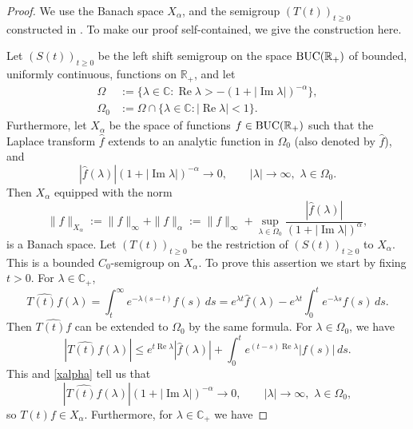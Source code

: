 \documentclass[11pt]{amsart}
\theoremstyle{definition}
\theoremstyle{remark}
\numberwithin{equation}{section}
\begin{document}
\begin{proof}
We use the Banach space $X_{\alpha}$, and the semigroup $(T(t))_{t\ge0}$ constructed in \cite[Theorem 4.1]{BoTo10}. To make our proof self-contained, we give the construction here.

Let $(S(t))_{t \ge 0}$ be the left shift semigroup on the space ${\rm BUC}
(\mathbb R_+ )$ of bound\-ed, uniformly continuous, functions on ${{\mathbb R}}_+$, and let
\begin{align*}
\Omega &:=\{\lambda \in\mathbb C: {\operatorname{Re}}  \lambda
> - (1+|{\operatorname{Im}} \lambda|)^{-\alpha}\}, \\
\Omega_0 &:=\Omega \cap \{\lambda \in \mathbb C: |{\operatorname{Re}} \lambda| < 1 \}.
\end{align*}
Furthermore, let
$X_{\alpha}$ be the space of functions $f\in {\rm BUC}({{\mathbb R}}_+ )$
such that the Laplace transform $\widehat{f}$ extends to an
analytic function in $\Omega_0$ (also denoted by $\widehat f$), and
\begin{equation} \label{xalpha}
|\widehat f(\lambda)|(1+|{\operatorname{Im}} \lambda|)^{-\alpha} \to 0, \qquad
|\lambda| \to \infty, \, \, \lambda \in \Omega_0.
\end{equation}
Then $X_\alpha$ equipped with the norm
\begin{equation*}
\| f \|_{X_{\alpha}}  := \| f \|_{\infty} + \|f \|_\alpha :=
\|f\|_{\infty} + \sup_{\lambda \in \Omega_0} \frac{|\widehat f(\lambda)|}
{(1+|{\operatorname{Im}}\lambda|)^{\alpha}},
\end{equation*}
is a Banach space.  Let $(T(t))_{t \ge 0}$ be the restriction of $(S(t))_{t \ge 0}$ to $X_\alpha$.  This is  a bounded $C_0$-semigroup on $X_\alpha$. To prove this assertion we start by fixing $t>0$.   For $\lambda \in {{\mathbb C}}_+$,
\begin{equation} \label{Tthat}
\widehat {T(t)f} (\lambda) =  \int_t^\infty e^{-\lambda (s-t)} f(s) \, ds = e^{\lambda t}\widehat{f}(\lambda) - e^{\lambda t} \int_{0}^{t} e^{-\lambda s}f(s) \, ds.
\end{equation}
Then $\widehat {T(t)f}$ can be extended to  $\Omega_0$ by the same formula.  For $\lambda\in\Omega_0$, we have
$$
|\widehat {T(t)f} (\lambda)|\le e^{t{\operatorname{Re}}\lambda}|\widehat {f} (\lambda)|
+\int_{0}^{t}e^{(t-s){\operatorname{Re}}\lambda}|f(s)| \, ds.
$$
This and \eqref{xalpha} tell us that
$$
|\widehat {T(t)f}(\lambda)|(1+|{\operatorname{Im}} \lambda|)^{-\alpha} \to 0, \qquad
|\lambda| \to \infty, \, \, \lambda \in \Omega_0,
$$
so $T(t)f \in X_\alpha$.  Furthermore, for $\lambda\in{{\mathbb C}}_+$ we have

\end{proof}
\end{document}
